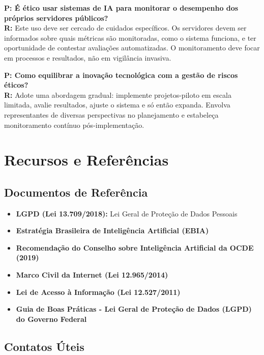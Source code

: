 \documentclass[12pt,a4paper]{article}
\begin{document}
\begin{tcolorbox}[example]
\textbf{P: É ético usar sistemas de IA para monitorar o desempenho dos próprios servidores públicos?} \\
\textbf{R:} Este uso deve ser cercado de cuidados específicos. Os servidores devem ser informados sobre quais métricas são monitoradas, como o sistema funciona, e ter oportunidade de contestar avaliações automatizadas. O monitoramento deve focar em processos e resultados, não em vigilância invasiva.
\end{tcolorbox}

\begin{tcolorbox}[example]
\textbf{P: Como equilibrar a inovação tecnológica com a gestão de riscos éticos?} \\
\textbf{R:} Adote uma abordagem gradual: implemente projetos-piloto em escala limitada, avalie resultados, ajuste o sistema e só então expanda. Envolva representantes de diversas perspectivas no planejamento e estabeleça monitoramento contínuo pós-implementação.
\end{tcolorbox}

\newpage
\section{Recursos e Referências}

\subsection{Documentos de Referência}

\begin{itemize}
    \item \textbf{LGPD (Lei 13.709/2018):} Lei Geral de Proteção de Dados Pessoais
    \item \textbf{Estratégia Brasileira de Inteligência Artificial (EBIA)}
    \item \textbf{Recomendação do Conselho sobre Inteligência Artificial da OCDE (2019)}
    \item \textbf{Marco Civil da Internet (Lei 12.965/2014)}
    \item \textbf{Lei de Acesso à Informação (Lei 12.527/2011)}
    \item \textbf{Guia de Boas Práticas - Lei Geral de Proteção de Dados (LGPD) do Governo Federal}
\end{itemize}

\subsection{Contatos Úteis}
\end{document}
